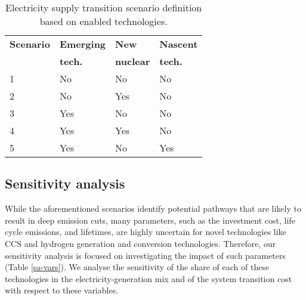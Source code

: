 \begin{table}[!ht]
	\caption{Electricity supply transition scenario definition based on enabled technologies.}
	\vspace{0.1in}
	\begin{tabularx}{0.65\textwidth}{p{} p{} p{} p{}}
\hline 
\textbf{Scenario}& \textbf{Emerging} & \textbf{New} & \textbf{Nascent}\\
 & \textbf{tech.} & \textbf{nuclear} & \textbf{tech.}\\

                  \hline
1               &  No       &         No     &     No  \\ 
2               &   No       &      Yes     &     No  \\ 
3               &   Yes     &         No      &     No   \\
4               &   Yes     &      Yes     &     No  \\ 
5               &   Yes     &      No     &     Yes  \\ 
\hline
	\end{tabularx}
\label{scen-table}
\end{table}



\subsection{Sensitivity analysis}
While the aforementioned scenarios identify potential pathways that are likely to result in deep emission cuts, many parameters, such as the investment cost, life cycle emissions, and lifetimes, are highly uncertain for novel technologies like \gls{CCS} and hydrogen generation and conversion technologies. Therefore, our sensitivity analysis is focused on investigating the impact of such parameters (Table \ref{sa-vars}). We analyse the sensitivity of the share of each of these technologies in the electricity-generation mix and of the system transition cost with respect to these variables.

